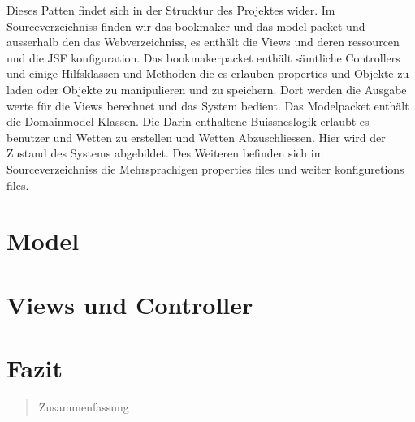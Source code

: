 \documentclass[a4paper, abstracton]{scrartcl}
\begin{document}
  Dieses Patten findet sich in der Strucktur des Projektes wider.
  Im Sourceverzeichniss finden wir das bookmaker und das model packet und
  ausserhalb den das Webverzeichniss, es enthält die Views und deren ressourcen
  und die JSF konfiguration.
  Das bookmakerpacket enthält sämtliche Controllers und einige Hilfsklassen und
  Methoden die es erlauben properties und Objekte zu laden oder Objekte zu
  manipulieren und zu speichern.
  Dort werden die Ausgabe werte für die Views berechnet und das System bedient.
  Das Modelpacket enthält die Domainmodel Klassen. Die Darin enthaltene
  Buissneslogik erlaubt es benutzer und Wetten zu erstellen und Wetten
  Abzuschliessen. Hier wird der Zustand des Systems abgebildet.
  Des Weiteren befinden sich im Sourceverzeichniss die Mehrsprachigen properties
  files und weiter konfiguretions files.

\section{Model}

  

\section{Views und Controller}

\section{Fazit}

\begin{abstract}
Zusammenfassung
\end{abstract}
\pagebreak
\tableofcontents	%
\pagebreak
\listoffigures		%

\pagebreak	%


\pagebreak


\pagebreak	
\end{document}
